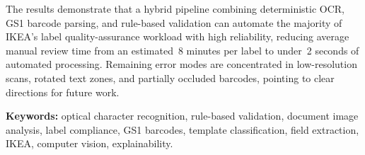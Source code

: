 The results demonstrate that a hybrid pipeline combining deterministic OCR, GS1
barcode parsing, and rule-based validation can automate the majority of IKEA's label
quality-assurance workload with high reliability, reducing average manual review time
from an estimated~8 minutes per label to under~2 seconds of automated processing.
Remaining error modes are concentrated in low-resolution scans, rotated text zones,
and partially occluded barcodes, pointing to clear directions for future work.

\vspace{1em}
\noindent\textbf{Keywords:}
optical character recognition, rule-based validation, document image analysis,
label compliance, GS1 barcodes, template classification, field extraction,
IKEA, computer vision, explainability.
\clearpage
